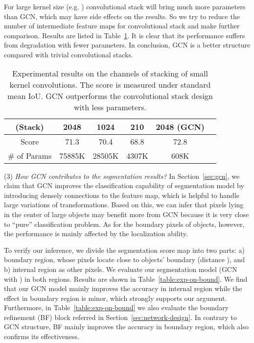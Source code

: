 \documentclass[10pt,twocolumn,letterpaper]{article}
\begin{document}
	For large kernel size (e.g. )  convolutional stack will bring much more parameters than GCN, which may have side effects on the results. So we try to reduce the number of intermediate feature maps for convolutional stack and make further comparison. Results are listed in Table~\ref{table:exp-on-stack-channels}. It is clear that its performance suffers from degradation with fewer parameters. In conclusion, GCN is a better structure compared with trivial convolutional stacks. 
	\begin{table}[h]
      \begin{center}
         \begin{tabular}{|c|c|c|c|c|c|}
         	\hline
         	 (Stack) & 2048 & 1024 & 210 & 2048 (GCN) \\
         	\hline
         	Score & 71.3 & 70.4 & 68.8 & 72.8\\
         	\hline
         	\# of Params & 75885K & 28505K & 4307K & 608K \\
         	\hline
         \end{tabular}
      \end{center}
      \caption{Experimental results on the channels of stacking of small kernel convolutions.  The score is measured under standard mean IoU. GCN outperforms the convolutional stack design with less parameters. }
      \label{table:exp-on-stack-channels}
   \end{table}
\par
	(3)	\emph{How GCN contributes to the segmentation results?} In Section~\ref{sec:gcn}, we claim that GCN improves the classification capability of segmentation model by introducing densely connections to the feature map, which is helpful to handle large variations of transformations. Based on this, we can infer that pixels lying in the center of large objects may benefit more from GCN because it is very close to ``pure'' classification problem. As for the boundary pixels of objects, however, the performance is mainly affected by the localization ability.
\par
	To verify our inference, we divide the segmentation score map into two parts: a) boundary region, whose pixels locate close to objects' boundary (distance ), and b) internal region as other pixels. We evaluate our segmentation model (GCN with ) in both regions. Results are shown in Table~\ref{table:exp-on-bound}. We find that our GCN model mainly improves the accuracy in internal region while the effect in boundary region is minor, which strongly supports our argument. Furthermore, in Table~\ref{table:exp-on-bound} we also evaluate the boundary refinement (BF) block referred in Section~\ref{sec:network-design}. In contrary to GCN structure, BF mainly improves the accuracy in boundary region, which also confirms its effectiveness.
\end{document}
